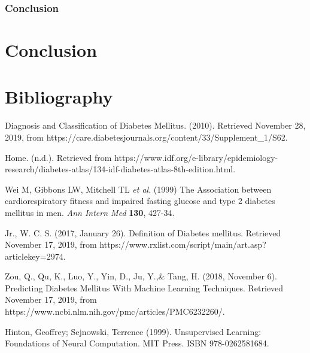 \documentclass[12pt]{article}
\begin{document}

\newpage
\section{Conclusion}


\newpage
\part{Conclusion}

\clearpage
\newpage
\part{Bibliography}
\begin{thebibliography}{}
Diagnosis and Classification of Diabetes Mellitus. (2010). Retrieved November 28, 2019, from https://care.diabetesjournals.org/content/33/Supplement\_1/S62.

Home. (n.d.). Retrieved from https://www.idf.org/e-library/epidemiology-research/diabetes-atlas/134-idf-diabetes-atlas-8th-edition.html.

Wei M, Gibbons LW, Mitchell TL \textit{et al}. (1999) The Association between cardiorespiratory fitness and impaired fasting glucose and type 2 diabetes mellitus in men. \textit{Ann Intern Med} \textbf{130}, 427-34.

Jr., W. C. S. (2017, January 26). Definition of Diabetes mellitus. Retrieved November 17, 2019, from https://www.rxlist.com/script/main/art.asp?articlekey=2974.

Zou, Q., Qu, K., Luo, Y., Yin, D., Ju, Y.,\& Tang, H. (2018, November 6). Predicting Diabetes Mellitus With Machine Learning Techniques. Retrieved November 17, 2019, from https://www.ncbi.nlm.nih.gov/pmc/articles/PMC6232260/.

Hinton, Geoffrey; Sejnowski, Terrence (1999). Unsupervised Learning: Foundations of Neural Computation. MIT Press. ISBN 978-0262581684.

\end{thebibliography}
\end{document}
